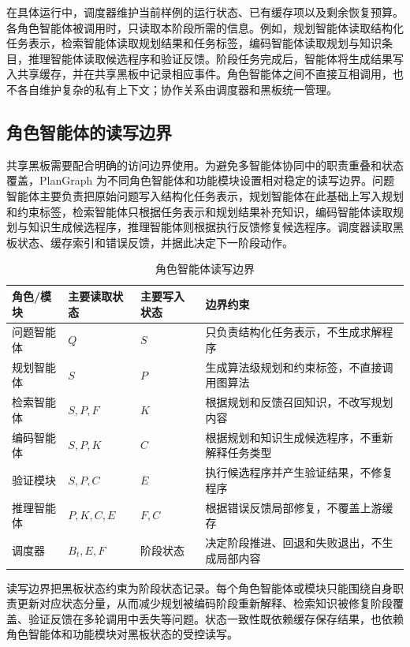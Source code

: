 在具体运行中，调度器维护当前样例的运行状态、已有缓存项以及剩余恢复预算。各角色智能体被调用时，只读取本阶段所需的信息。例如，规划智能体读取结构化任务表示，检索智能体读取规划结果和任务标签，编码智能体读取规划与知识条目，推理智能体读取候选程序和验证反馈。阶段任务完成后，智能体将生成结果写入共享缓存，并在共享黑板中记录相应事件。角色智能体之间不直接互相调用，也不各自维护复杂的私有上下文；协作关系由调度器和黑板统一管理。

\subsection{角色智能体的读写边界}

共享黑板需要配合明确的访问边界使用。为避免多智能体协同中的职责重叠和状态覆盖，PlanGraph 为不同角色智能体和功能模块设置相对稳定的读写边界。问题智能体主要负责把原始问题写入结构化任务表示，规划智能体在此基础上写入规划和约束标签，检索智能体只根据任务表示和规划结果补充知识，编码智能体读取规划与知识生成候选程序，推理智能体则根据执行反馈修复候选程序。调度器读取黑板状态、缓存索引和错误反馈，并据此决定下一阶段动作。

\begin{table}[htbp]
\centering
\small
\caption{角色智能体读写边界}
\label{tab:agent_read_write}
\renewcommand{\arraystretch}{1.15}
\begin{tabularx}{\textwidth}{
>{\raggedright\arraybackslash}p{2.3cm}
>{\raggedright\arraybackslash}p{2.8cm}
>{\raggedright\arraybackslash}p{2.8cm}
>{\raggedright\arraybackslash}X}
\toprule
角色/模块 & 主要读取状态 & 主要写入状态 & 边界约束 \\
\midrule
问题智能体 & $Q$ & $S$ & 只负责结构化任务表示，不生成求解程序 \\
规划智能体 & $S$ & $P$ & 生成算法级规划和约束标签，不直接调用图算法 \\
检索智能体 & $S,P,F$ & $K$ & 根据规划和反馈召回知识，不改写规划内容 \\
编码智能体 & $S,P,K$ & $C$ & 根据规划和知识生成候选程序，不重新解释任务类型 \\
验证模块 & $S,P,C$ & $E$ & 执行候选程序并产生验证结果，不修复程序 \\
推理智能体 & $P,K,C,E$ & $F,C$ & 根据错误反馈局部修复，不覆盖上游缓存 \\
调度器 & $B_t,E,F$ & 阶段状态 & 决定阶段推进、回退和失败退出，不生成局部内容 \\
\bottomrule
\end{tabularx}
\end{table}

读写边界把黑板状态约束为阶段状态记录。每个角色智能体或模块只能围绕自身职责更新对应状态分量，从而减少规划被编码阶段重新解释、检索知识被修复阶段覆盖、验证反馈在多轮调用中丢失等问题。状态一致性既依赖缓存保存结果，也依赖角色智能体和功能模块对黑板状态的受控读写。

